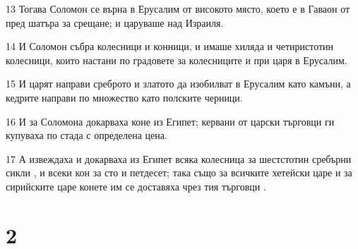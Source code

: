 \par 13 Тогава Соломон се върна в Ерусалим от високото място, което е в Гаваон от пред шатъра за срещане; и царуваше над Израиля.
\par 14 И Соломон събра колесници и конници, и имаше хиляда и четиристотин колесници, които настани по градовете за колесниците и при царя в Ерусалим.
\par 15 И царят направи среброто и златото да изобилват в Ерусалим като камъни, а кедрите направи по множество като полските черници.
\par 16 И за Соломона докарваха коне из Египет; кервани от царски търговци ги купуваха по стада с определена цена.
\par 17 А извеждаха и докарваха из Египет всяка колесница за шестстотин сребърни сикли , и всеки кон за сто и петдесет; така също за всичките хетейски царе и за сирийските царе конете им се доставяха чрез тия търговци .

\chapter{2}

